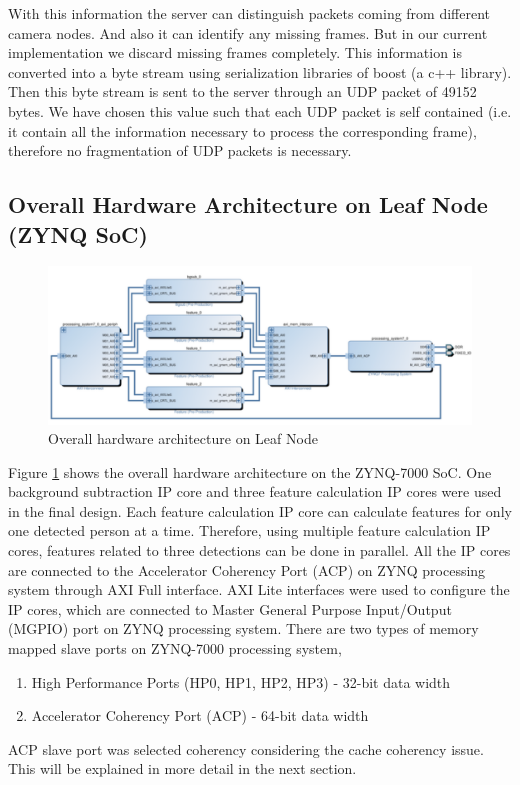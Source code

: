 \documentclass[12pt,a4paper]{report}
\begin{document}
With this information the server can distinguish packets coming from different camera nodes. And also it can identify any missing frames. But in our current implementation we discard missing frames completely. This information is converted into a byte stream using serialization libraries of boost (a c++ library). Then this byte stream is sent to the server through an UDP packet of 49152 bytes. We have chosen this value such that each UDP packet is self contained (i.e. it contain all the information necessary to process the corresponding frame), therefore no fragmentation of UDP packets is necessary.

\subsection{Overall Hardware Architecture on Leaf Node (ZYNQ SoC)}


\begin{figure}[H]
\includegraphics[width=\textwidth]{overallhardware}
\centering
\caption{Overall hardware architecture on Leaf Node}
\label{overallhardware}
\end{figure}


Figure \ref{overallhardware} shows the overall hardware architecture on the ZYNQ-7000 SoC. One background subtraction IP core and three feature calculation IP cores were used in the final design. Each feature calculation IP core can calculate features for only one detected person at a time. Therefore, using multiple feature calculation IP cores, features related to three detections can be done in parallel. All the IP cores are connected to the Accelerator Coherency Port (ACP) on ZYNQ processing system through AXI Full interface. AXI Lite interfaces were used to configure the IP cores, which are connected to Master General Purpose Input/Output (MGPIO) port on ZYNQ processing system. There are two types of memory mapped slave ports on ZYNQ-7000 processing system,
\begin{enumerate}
\item High Performance Ports (HP0, HP1, HP2, HP3) - 32-bit data width
\item Accelerator Coherency Port (ACP) - 64-bit data width
\end{enumerate}
ACP slave port was selected coherency considering the cache coherency issue. This will be explained in more detail in the next section.
\end{document}
